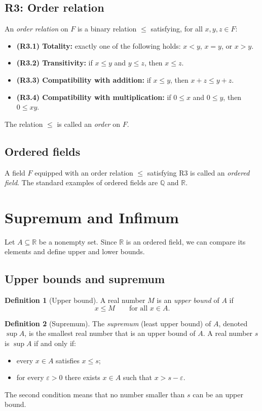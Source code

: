 \documentclass[11pt,a4paper]{article}
\theoremstyle{definition} \newtheorem{definition}{Definition} \theoremstyle{plain} \newtheorem{theorem}{Theorem}
\begin{document}
\subsection{R3: Order relation}
An \emph{order relation} on $F$ is a binary relation $\le$ satisfying, for all $x,y,z\in F$:
\begin{itemize}
\item \textbf{(R3.1) Totality:} exactly one of the following holds:
$x<y$, $x=y$, or $x>y$.
\item \textbf{(R3.2) Transitivity:} if $x\le y$ and $y\le z$, then $x\le z$.
\item \textbf{(R3.3) Compatibility with addition:}
if $x\le y$, then $x+z \le y+z$.
\item \textbf{(R3.4) Compatibility with multiplication:}
if $0\le x$ and $0\le y$, then $0\le xy$. \end{itemize}
The relation $\le$ is called an \emph{order} on $F$.
\subsection{Ordered fields}
A field $F$ equipped with an order relation $\le$ satisfying R3 is called an \emph{ordered field}.
The standard examples of ordered fields are $\mathbb{Q}$ and $\mathbb{R}$.
\clearpage
\section{Supremum and Infimum}\label{sec:supremum}
Let $A\subseteq\mathbb{R}$ be a nonempty set. Since $\mathbb{R}$ is an ordered field, we can compare its elements and define upper and lower bounds.
\subsection{Upper bounds and supremum}
\begin{definition}[Upper bound] A real number $M$ is an \emph{upper bound} of $A$ if
\[ x \le M \qquad \text{for all } x\in A. \]
\end{definition}
\begin{definition}[Supremum] The \emph{supremum} (least upper bound) of $A$, denoted $\sup A$, is the smallest real number that is an upper bound of $A$.
A real number $s$ is $\sup A$ if and only if:
\begin{itemize}
\item every $x\in A$ satisfies $x\le s$;
\item for every $\varepsilon>0$ there exists $x\in A$ such that $x > s-\varepsilon$. \end{itemize}
\end{definition}
The second condition means that no number smaller than $s$ can be an upper bound.
\end{document}

